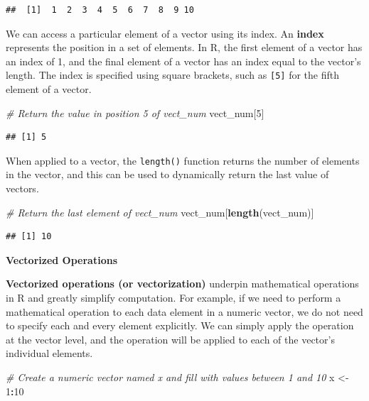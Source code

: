 \documentclass[]{book}
\newenvironment{Shaded}{\begin{snugshade}}{\end{snugshade}}
\newcommand{\CommentTok}[1]{\textcolor[rgb]{0.56,0.35,0.01}{\textit{#1}}}
\newcommand{\DecValTok}[1]{\textcolor[rgb]{0.00,0.00,0.81}{#1}}
\newcommand{\KeywordTok}[1]{\textcolor[rgb]{0.13,0.29,0.53}{\textbf{#1}}}
\newcommand{\NormalTok}[1]{#1}
\newcommand{\OperatorTok}[1]{\textcolor[rgb]{0.81,0.36,0.00}{\textbf{#1}}}
\newcommand{\StringTok}[1]{\textcolor[rgb]{0.31,0.60,0.02}{#1}}
\begin{document}
\begin{verbatim}
##  [1]  1  2  3  4  5  6  7  8  9 10
\end{verbatim}

We can access a particular element of a vector using its index. An \textbf{index} represents the position in a set of elements. In R, the first element of a vector has an index of 1, and the final element of a vector has an index equal to the vector's length. The index is specified using square brackets, such as \texttt{{[}5{]}} for the fifth element of a vector.

\begin{Shaded}
\begin{Highlighting}[]
\CommentTok{# Return the value in position 5 of vect_num}
\NormalTok{vect_num[}\DecValTok{5}\NormalTok{]}
\end{Highlighting}
\end{Shaded}

\begin{verbatim}
## [1] 5
\end{verbatim}

When applied to a vector, the \texttt{length()} function returns the number of elements in the vector, and this can be used to dynamically return the last value of vectors.

\begin{Shaded}
\begin{Highlighting}[]
\CommentTok{# Return the last element of vect_num}
\NormalTok{vect_num[}\KeywordTok{length}\NormalTok{(vect_num)]}
\end{Highlighting}
\end{Shaded}

\begin{verbatim}
## [1] 10
\end{verbatim}

\textbf{Vectorized Operations}

\textbf{Vectorized operations (or vectorization)} underpin mathematical operations in R and greatly simplify computation. For example, if we need to perform a mathematical operation to each data element in a numeric vector, we do not need to specify each and every element explicitly. We can simply apply the operation at the vector level, and the operation will be applied to each of the vector's individual elements.

\begin{Shaded}
\begin{Highlighting}[]
\CommentTok{# Create a numeric vector named x and fill with values between 1 and 10}
\NormalTok{x <-}\StringTok{ }\DecValTok{1}\OperatorTok{:}\DecValTok{10}
\end{Highlighting}
\end{Shaded}
\end{document}
